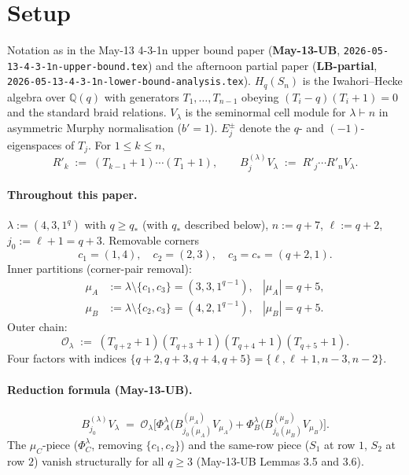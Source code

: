 \documentclass[11pt]{article}
\theoremstyle{definition}
\begin{document}
\section{Setup}\label{sec:setup}

Notation as in the May-13 4-3-1n upper bound paper
(\textbf{May-13-UB}, \texttt{2026-05-13-4-3-1n-upper-bound.tex}) and
the afternoon partial paper (\textbf{LB-partial},
\texttt{2026-05-13-4-3-1n-lower-bound-analysis.tex}).
$H_q(S_n)$ is the Iwahori--Hecke algebra over $\mathbb{Q}(q)$ with
generators $T_1, \ldots, T_{n-1}$ obeying $(T_i - q)(T_i + 1) = 0$
and the standard braid relations. $V_\lambda$ is the seminormal cell
module for $\lambda \vdash n$ in asymmetric Murphy normalisation
($b' = 1$). $E_j^\pm$ denote the $q$- and $(-1)$-eigenspaces of
$T_j$. For $1 \le k \le n$,
\[
   R'_k \;:=\; (T_{k-1}{+}1)\cdots(T_1{+}1),
   \qquad
   B^{(\lambda)}_j V_\lambda \;:=\; R'_j\cdots R'_n V_\lambda.
\]

\paragraph{Throughout this paper.} $\lambda := (4, 3, 1^q)$ with
$q \ge q_*$ (with $q_*$ described below), $n := q + 7$,
$\ell := q + 2$, $j_0 := \ell + 1 = q + 3$. Removable corners
\[
   c_1 = (1, 4), \quad c_2 = (2, 3), \quad c_3 = c_* = (q+2, 1).
\]
Inner partitions (corner-pair removal):
\begin{align*}
   \mu_A &:= \lambda \setminus \{c_1, c_3\} = (3, 3, 1^{q-1}),
      &|\mu_A| = q+5, \\
   \mu_B &:= \lambda \setminus \{c_2, c_3\} = (4, 2, 1^{q-1}),
      &|\mu_B| = q+5.
\end{align*}
Outer chain:
\[
   \mathcal{O}_\lambda \;:=\;
   (T_{q+2}{+}1)(T_{q+3}{+}1)(T_{q+4}{+}1)(T_{q+5}{+}1).
\]
Four factors with indices $\{q+2, q+3, q+4, q+5\} = \{\ell, \ell+1,
n-3, n-2\}$.

\paragraph{Reduction formula (May-13-UB).}
\begin{equation}\label{eq:reduction}
   B^{(\lambda)}_{j_0} V_\lambda
   \;=\;
   \mathcal{O}_\lambda \Big[
      \Phi_A^\lambda\big(B^{(\mu_A)}_{j_0(\mu_A)} V_{\mu_A}\big)
      +
      \Phi_B^\lambda\big(B^{(\mu_B)}_{j_0(\mu_B)} V_{\mu_B}\big)
   \Big].
\end{equation}
The $\mu_C$-piece ($\Phi_C^\lambda$, removing $\{c_1, c_2\}$) and the
same-row piece ($S_1$ at row $1$, $S_2$ at row $2$) vanish structurally
for all $q \ge 3$ (May-13-UB Lemmas 3.5 and 3.6).
\end{document}
